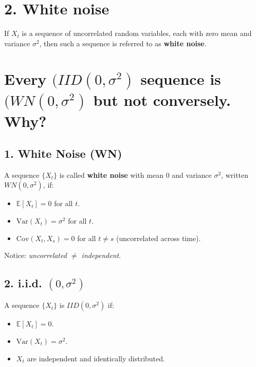 \documentclass[
  11pt,
  a4paper,
]{report}
\providecommand{\tightlist}{%
  \setlength{\itemsep}{0pt}\setlength{\parskip}{0pt}}\usepackage{longtable,booktabs,array}
\begin{document}
\section{2. White noise}\label{white-noise}

If \({X_t}\) is a sequence of uncorrelated random variables, each with
zero mean and variance \(\sigma^2\), then such a sequence is referred to
as \textbf{white noise}.

\section{\texorpdfstring{Every \((IID(0, \sigma^2)\) sequence is
\((WN(0, \sigma^2)\) but not conversely.
Why?}{Every (IID(0, \textbackslash sigma\^{}2) sequence is (WN(0, \textbackslash sigma\^{}2) but not conversely. Why?}}\label{every-iid0-sigma2-sequence-is-wn0-sigma2-but-not-conversely.-why}

\subsection{1. White Noise (WN)}\label{white-noise-wn}

A sequence \(\{X_t\}\) is called \textbf{white noise} with mean \(0\)
and variance \(\sigma^2\), written \(WN(0, \sigma^2)\), if:

\begin{itemize}
\tightlist
\item
  \(\mathbb{E}[X_t] = 0\) for all \(t\).\\
\item
  \(\mathrm{Var}(X_t) = \sigma^2\) for all \(t\).\\
\item
  \(\mathrm{Cov}(X_t, X_s) = 0\) for all \(t \neq s\) (uncorrelated
  across time).
\end{itemize}

Notice: \emph{uncorrelated \(\neq\) independent}.

\subsection{\texorpdfstring{2. i.i.d.
\((0, \sigma^2)\)}{2. i.i.d. (0, \textbackslash sigma\^{}2)}}\label{i.i.d.-0-sigma2}

A sequence \(\{X_t\}\) is \(IID(0, \sigma^2)\) if:

\begin{itemize}
\tightlist
\item
  \(\mathbb{E}[X_t] = 0\).\\
\item
  \(\mathrm{Var}(X_t) = \sigma^2\).\\
\item
  \(X_t\) are independent and identically distributed.
\end{itemize}
\end{document}
